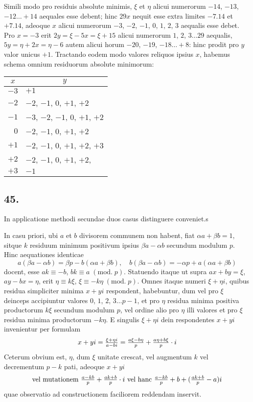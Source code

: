 \documentclass[twoside,12pt]{memoir}
\renewcommand{\pmod}[1]{\;(\textrm{mod.}\;#1)}
\let\oldfrac\frac
\def\frac#1#2{\mathchoice{\tfrac{#1}{#2}}{\oldfrac{#1}{#2}}{\genfrac{}{}{}{2}{#1}{#2\mathstrut}}{\genfrac{}{}{}{3}{#1}{#2\mathstrut}}}
\begin{document}
Simili modo pro residuis absolute minimis, \(\xi\) et \(\eta\) alicui numerorum \(-14\), \(-13\), \(-12 \ldots+14\) aequales esse debent; hinc \(29 x\) nequit esse extra limites \(-7.14\) et \(+7.14\), adeoque \(x\) alicui numerorum \(-3\), \(-2\), \(-1\), \(0\), \(1\), \(2\), \(3\) aequalis esse debet. Pro \(x=-3\) erit \(2 y=\xi-5 x=\xi+15\) alicui numerorum \(1\), \(2\), \(3 \ldots 29\) aequalis, \(5 y=\eta+2 x=\eta-6\) autem alicui horum \(-20\), \(-19\), \(-18 \ldots+8\): hinc prodit pro \(y\) valor unicus \(+1\). Tractando eodem modo valores reliquos ipsius \(x\), habemus schema omnium residuorum absolute minimorum:
\begin{center}
\begin{tabular}{r|l}
\multicolumn{1}{c|}{\(x\)} & \multicolumn{1}{c}{\(y\)} \\
\hline
\(-3\) & \(+1\) \\
\(-2\) & \(-2\), \(-1\), \(0\), \(+1\), \(+2\) \\
\(-1\) & \(-3\), \(-2\), \(-1\), \(0\), \(+1\), \(+2\) \\
\(0\) & \(-2\), \(-1\), \(0\), \(+1\), \(+2\) \\
\(+1\) & \(-2\), \(-1\), \(0\), \(+1\), \(+2\), \(+3\) \\
\(+2\) & \(-2\), \(-1\), \(0\), \(+1\), \(+2\), \\
\(+3\) & \(-1\) \\
\end{tabular}
\end{center}

\subsection*{45.}
 
In applicatione methodi secundae duos casus distinguere conveniet.s
 
In casu priori, ubi \(a\) et \(b\) divisorem communem non habent, fiat \(\alpha a+\beta b=1\), sitque \(k\) residuum minimum positivum ipsius \(\beta a-\alpha b\) secundum modulum \(p\). Hinc aequationes identicae
\[a(\beta a-\alpha b)=\beta p-b(\alpha a+\beta b), \quad b(\beta a-\alpha b)=-\alpha p+a(\alpha a+\beta b)\]
docent, esse \(a k \equiv-b\), \(b k \equiv a\pmod{p}\). Statuendo itaque ut supra \(a x+b y=\xi\),\pagebreak%
\(a y-b x=\eta\), erit \(\eta \equiv k \xi\), \(\xi \equiv-k \eta\pmod{p}\). Omnes itaque numeri \(\xi+\eta i\), quibus residua simpliciter minima \(x+y i\) respondent, habebuntur, dum vel pro \(\xi\) deinceps accipiuntur valores \(0\), \(1\), \(2\), \(3 \ldots p-1\), et pro \(\eta\) residua minima positiva productorum \(k \xi\) secundum modulum \(p\), vel ordine alio pro \(\eta\) illi valores et pro \(\xi\) residua minima productorum \(-k \eta\). E singulis \(\xi+\eta i\) dein respondentes \(x+y i\) invenientur per formulam
\[x+y i=\frac{\xi+\eta i}{a-b i}=\frac{a \xi-b \eta}{p}+\frac{a \eta+b \xi}{p} \cdot i\]
Ceterum obvium est, \(\eta\), dum \(\xi\) unitate crescat, vel augmentum \(k\) vel decrementum \(p-k\) pati, adeoque \(x+y i\)
\[\text{vel mutationem \(\frac{a-k b}{p}+\frac{a k+b}{p} \cdot i\) vel hanc \(\frac{a-k b}{p}+b+(\frac{a k+b}{p}-a) i\)}\]
quae observatio ad constructionem faciliorem reddendam inservit.
\end{document}
